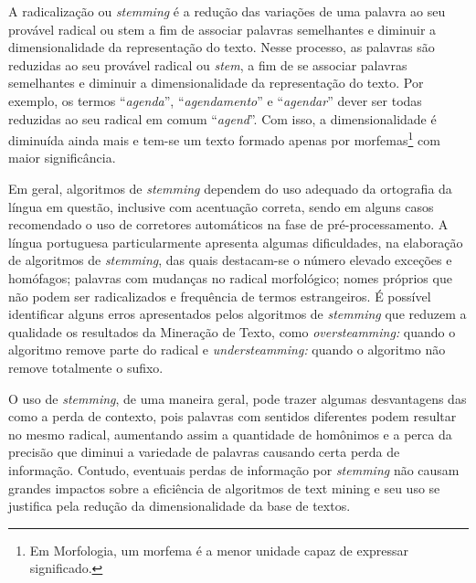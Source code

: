 A radicalização ou \textit{stemming} é a redução das variações de uma palavra ao seu provável radical ou stem a fim de associar palavras semelhantes e diminuir a dimensionalidade da representação do texto.
Nesse processo, as palavras são reduzidas ao seu provável radical ou \textit{stem}, a fim de se associar palavras semelhantes e diminuir a dimensionalidade da representação do texto. Por exemplo, os termos ``\textit{agenda}'', ``\textit{agendamento}'' e ``\textit{agendar}'' dever ser todas reduzidas ao seu radical em comum ``\textit{agend}''. Com isso, a dimensionalidade é diminuída ainda mais e tem-se um texto formado apenas por morfemas\footnote{Em Morfologia, um morfema é a menor unidade capaz de expressar significado.} com maior significância.  
% 
%

Em geral, algoritmos de \textit{stemming} dependem do uso adequado da ortografia da língua em questão, inclusive com acentuação correta, sendo em alguns casos recomendado o uso de corretores automáticos na fase de pré-processamento. A língua portuguesa particularmente apresenta algumas dificuldades, na elaboração de algoritmos de \textit{stemming}, das quais destacam-se o número elevado exceções e homófagos; palavras com mudanças no radical morfológico; nomes próprios que não podem ser radicalizados e frequência de termos estrangeiros.  É possível identificar alguns erros apresentados pelos algoritmos de \textit{stemming} que reduzem a qualidade os resultados da Mineração de Texto, como \textit{oversteamming:} quando o algoritmo remove parte do radical e \textit{understeamming:} quando o algoritmo não remove totalmente o sufixo.

O uso de \textit{stemming}, de uma maneira geral, pode trazer algumas desvantagens das como a perda de contexto, pois palavras com sentidos diferentes podem resultar no mesmo radical, aumentando assim a quantidade de homônimos e a perca da precisão que diminui a variedade de palavras causando certa perda de informação. Contudo, eventuais perdas de informação por \textit{stemming} não causam grandes impactos sobre a eficiência de algoritmos de text mining e seu uso se justifica pela redução da dimensionalidade da base de textos.



